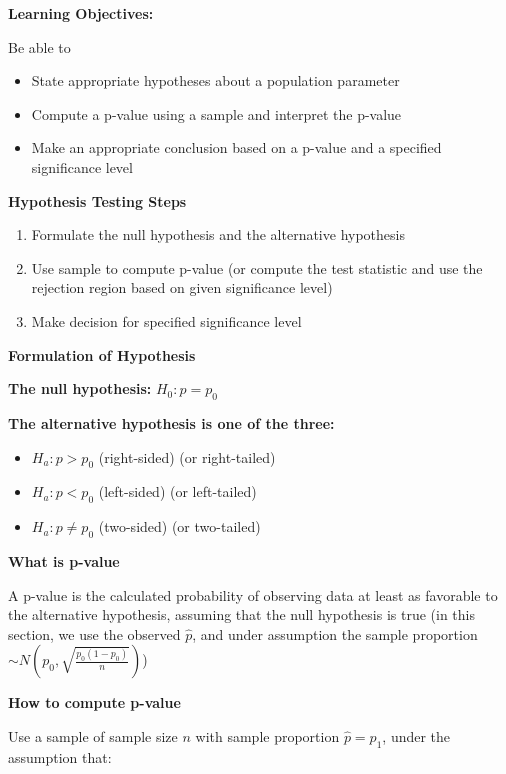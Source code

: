 \documentclass[
]{book}
\providecommand{\tightlist}{%
  \setlength{\itemsep}{0pt}\setlength{\parskip}{0pt}}
\begin{document}
\textbf{Learning Objectives:}

Be able to

\begin{itemize}
\tightlist
\item
  State appropriate hypotheses about a population parameter
\item
  Compute a p-value using a sample and interpret the p-value
\item
  Make an appropriate conclusion based on a p-value and a specified significance level
\end{itemize}

\textbf{Hypothesis Testing Steps}

\begin{enumerate}
\def\labelenumi{\arabic{enumi}.}
\tightlist
\item
  Formulate the null hypothesis and the alternative hypothesis
\item
  Use sample to compute p-value (or compute the test statistic and use the rejection region based on given significance level)
\item
  Make decision for specified significance level
\end{enumerate}

\textbf{Formulation of Hypothesis}

\textbf{The null hypothesis:} \(H_0: p = p_0\)

\textbf{The alternative hypothesis is one of the three:}

\begin{itemize}
\tightlist
\item
  \(H_a: p > p_0\) (right-sided) (or right-tailed)
\item
  \(H_a: p < p_0\) (left-sided) (or left-tailed)
\item
  \(H_a: p \neq p_0\) (two-sided) (or two-tailed)
\end{itemize}

\textbf{What is p-value}

A p-value is the calculated probability of observing data at least as favorable to the alternative hypothesis, assuming that the null hypothesis is true (in this section, we use the observed \(\hat{p}\), and under assumption the sample proportion \(\sim N(p_0, \sqrt{\frac{p_0(1-p_0)}{n}})\))

\textbf{How to compute p-value}

Use a sample of sample size \(n\) with sample proportion \(\hat{p}=p_1\), under the assumption that:
\end{document}
